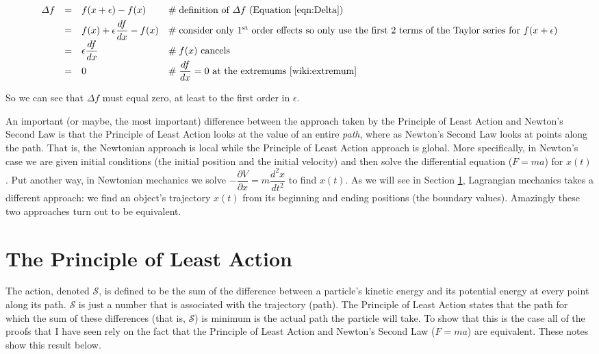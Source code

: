 \documentclass{article}
\theoremstyle{definition}
\begin{document}
\begin{equation*}
\begin{array}{lllll}
\Delta f 
&=&  f(x + \epsilon) - f(x)                     &\mathrel{\#} \text{definition of $\Delta f$ (Equation \ref{eqn:Delta})} \\
[4pt]
&=& f(x) + \epsilon \dfrac{df}{dx} - f(x)       &\mathrel{\#} \text{consider only $1^{\text{st}}$ order effects so only use the first 2 terms of the Taylor series for $f(x + \epsilon)$} \\
[4pt]
&=& \epsilon \dfrac{df}{dx}                     &\mathrel{\#} \text{$f(x)$ cancels} \\
[4pt]
&=& 0                                           &\mathrel{\#} \text{$\dfrac{df}{dx} = 0$ at the extremums \cite{wiki:extremum}}
\end{array}
\end{equation*}

\bigskip
\noindent
So we can see that $\Delta f$ must equal zero, at least to the
first order in $\epsilon$. 


\bigskip
{
\noindent
An important (or maybe, the most important) difference between
the approach taken by the Principle of Least Action and Newton's
Second Law is that the Principle of Least Action looks at the
value of an entire  \emph{path}, where as Newton's Second Law
looks at points along the path. That is, the Newtonian approach
is local while the Principle of Least Action approach is
global. More specifically, in Newton's case we  
are given initial conditions (the initial position and the
initial velocity) and then solve the differential equation
($F=ma$) for $x(t)$. Put another way, in Newtonian mechanics we
solve $- \dfrac{\partial V}{\partial x} = m \dfrac{d^2x}{dt^2}$
to find $x(t)$. As we will see in Section \ref{sec:pola},
Lagrangian mechanics takes a different approach: we find an
object's trajectory $x(t)$ from its beginning  and ending
positions (the boundary values). Amazingly these two approaches
turn out to be equivalent. \par} 

\section{The Principle of Least Action}
\label{sec:pola}
The action, denoted $\mathcal{S}$,  is defined to be the sum of
the difference between a particle's kinetic energy
\cite{wiki:kinetic_energy} and its potential energy
\cite{wiki:potential_energy} at every point along its path.
$\mathcal{S}$ is just a number that is associated with the
trajectory (path).  The Principle of Least  Action states that
the path for which the sum of these differences (that is,
$\mathcal{S}$) is minimum is the actual path the particle will
take. To show that this is the case all of the proofs that I have
seen rely on the fact that the Principle of Least  Action and
Newton's Second Law ($F=ma$) are equivalent. These notes show
this result below. 
\end{document}
